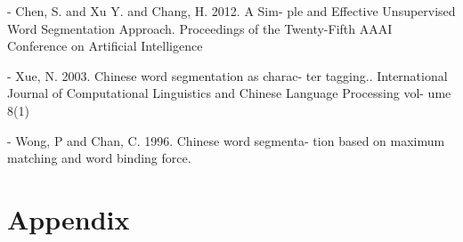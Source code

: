\documentclass[12pt]{comjnl}
\begin{document}
- Chen, S. and Xu Y. and Chang, H. 2012. A Sim-
ple and Effective Unsupervised Word Segmentation
Approach. Proceedings of the Twenty-Fifth AAAI
Conference on Artificial Intelligence

- Xue, N. 2003. Chinese word segmentation as charac-
ter tagging.. International Journal of Computational
Linguistics and Chinese Language Processing vol-
ume 8(1)

- Wong, P and Chan, C. 1996. Chinese word segmenta-
tion based on maximum matching and word binding
force.
\nocite{*}




\section{Appendix}
\end{document}
